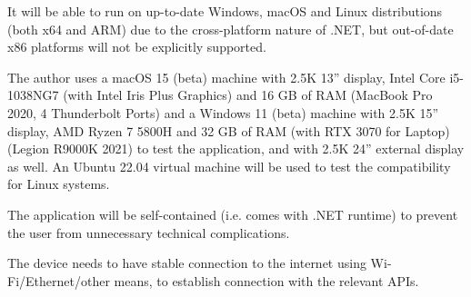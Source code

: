 It will be able to run on up-to-date Windows, macOS and Linux distributions (both x64 and ARM) due to the cross-platform nature of .NET, but out-of-date x86 platforms will not be explicitly supported.

The author uses a macOS 15 (beta) machine with 2.5K 13'' display, Intel Core i5-1038NG7 (with Intel Iris Plus Graphics) and 16 GB of RAM (MacBook Pro 2020, 4 Thunderbolt Ports) and a Windows 11 (beta) machine with 2.5K 15'' display, AMD Ryzen 7 5800H and 32 GB of RAM (with RTX 3070 for Laptop) (Legion R9000K 2021) to test the application, and with 2.5K 24'' external display as well. An Ubuntu 22.04 virtual machine will be used to test the compatibility for Linux systems.

The application will be self-contained (i.e. comes with .NET runtime) to prevent the user from unnecessary technical complications.

The device needs to have stable connection to the internet using Wi-Fi/Ethernet/other means, to establish connection with the relevant APIs.